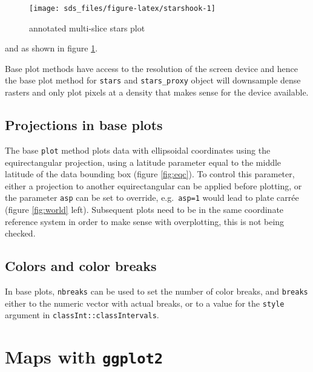 \documentclass[]{book}
\begin{document}
\begin{figure}

{\centering \texttt{[image: sds\_files/figure-latex/starshook-1]} 

}

\caption{annotated multi-slice stars plot}\label{fig:starshook}
\end{figure}

and as shown in figure \ref{fig:starshook}.

Base plot methods have access to the resolution of the screen device
and hence the base plot method for \texttt{stars} and \texttt{stars\_proxy} object
will downsample dense rasters and only plot pixels at a density
that makes sense for the device available.

\hypertarget{projections-in-base-plots}{%
\subsection{Projections in base plots}\label{projections-in-base-plots}}

The base \texttt{plot} method plots data with ellipsoidal coordinates
using the equirectangular projection, using a latitude parameter
equal to the middle latitude of the data bounding box (figure
\ref{fig:eqc}). To control this parameter, either a projection
to another equirectangular can be applied before plotting, or the
parameter \texttt{asp} can be set to override, e.g.~\texttt{asp=1} would lead to
plate carrée (figure \ref{fig:world} left). Subsequent plots need
to be in the same coordinate reference system in order to make
sense with overplotting, this is not being checked.

\hypertarget{colors-and-color-breaks}{%
\subsection{Colors and color breaks}\label{colors-and-color-breaks}}

In base plots, \texttt{nbreaks} can be used to set the number of color
breaks, and \texttt{breaks} either to the numeric vector with actual breaks,
or to a value for the \texttt{style} argument in \texttt{classInt::classIntervals}.

\hypertarget{maps-with-ggplot2}{%
\section{\texorpdfstring{Maps with \texttt{ggplot2}}{Maps with ggplot2}}\label{maps-with-ggplot2}}
\end{document}
